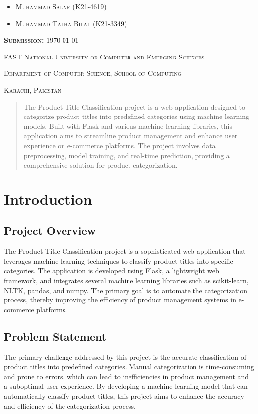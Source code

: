 \documentclass[10pt]{article}
\begin{document}
\begin{titlepage}
\begin{itemize}
        \item {\scshape\Large Muhammad Salar (K21-4619)}
        \item {\scshape\Large Muhammad Talha Bilal (K21-3349)}
    \end{itemize}
    \vspace{1cm}
    {\scshape\LARGE\textbf{Submission:} \scshape\Large \today \par}
    \centering
    \vfill
    {\scshape\large FAST National University of Computer and Emerging Sciences \par}
    {\scshape\large Department of Computer Science, School of Computing \par}
    {\scshape\large Karachi, Pakistan \par}
\end{titlepage}

\tableofcontents
\newpage

\begin{abstract}
\noindent The Product Title Classification project is a web application designed to categorize product titles into predefined categories using machine learning models. Built with Flask and various machine learning libraries, this application aims to streamline product management and enhance user experience on e-commerce platforms. The project involves data preprocessing, model training, and real-time prediction, providing a comprehensive solution for product categorization.
\end{abstract}

\section{Introduction}

\subsection{Project Overview}
The Product Title Classification project is a sophisticated web application that leverages machine learning techniques to classify product titles into specific categories. The application is developed using Flask, a lightweight web framework, and integrates several machine learning libraries such as scikit-learn, NLTK, pandas, and numpy. The primary goal is to automate the categorization process, thereby improving the efficiency of product management systems in e-commerce platforms.

\subsection{Problem Statement}
The primary challenge addressed by this project is the accurate classification of product titles into predefined categories. Manual categorization is time-consuming and prone to errors, which can lead to inefficiencies in product management and a suboptimal user experience. By developing a machine learning model that can automatically classify product titles, this project aims to enhance the accuracy and efficiency of the categorization process.
\end{document}
